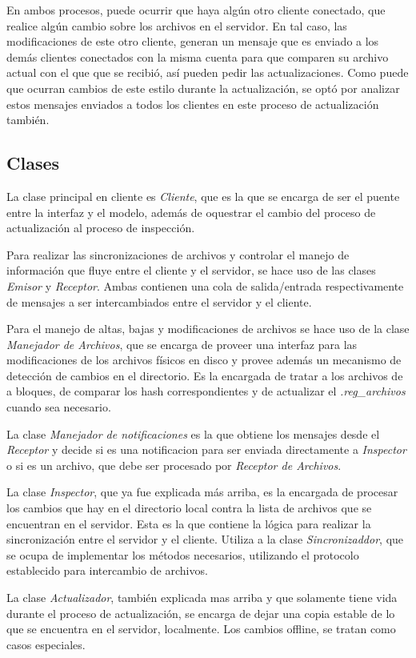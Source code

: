 \documentclass{article}
\begin{document}
	\par
	En ambos procesos, puede ocurrir que haya algún otro cliente conectado, que realice algún cambio sobre los archivos en el servidor. En tal caso, las modificaciones de este otro cliente, generan un mensaje que es enviado a los demás clientes conectados con la misma cuenta para que comparen su archivo actual con el que que se recibió, así pueden pedir las actualizaciones. Como puede que ocurran cambios de este estilo durante la actualización, se optó por analizar estos mensajes enviados a todos los clientes en este proceso de actualización también.
\bigskip



\subsection{Clases}

	La clase principal en cliente es \textit{Cliente}, que es la que se encarga de ser el puente entre la interfaz y el modelo, además de oquestrar el cambio del proceso de actualización al proceso de inspección. 
	\par
	Para realizar las sincronizaciones de archivos y controlar el manejo de información que fluye entre el cliente y el servidor, se hace uso de las clases \textit{Emisor} y \textit{Receptor}. Ambas contienen una cola de salida/entrada respectivamente de mensajes a ser intercambiados entre el servidor y el cliente. 
	\par
	Para el manejo de altas, bajas y modificaciones de archivos se hace uso de la clase \textit{Manejador de Archivos}, que se encarga de proveer una interfaz para las modificaciones de los archivos físicos en disco y provee además un mecanismo de detección de cambios en el directorio. Es la encargada de tratar a los archivos de a bloques, de comparar los hash correspondientes y de actualizar el \textit{.reg_archivos} cuando sea necesario. 
	\par
	La clase \textit{Manejador de notificaciones} es la que obtiene los mensajes desde el \textit{Receptor} y decide si es una notificacion para ser enviada directamente a \textit{Inspector} o si es un archivo, que debe ser procesado por \textit{Receptor de Archivos}. 
	\par
	La clase \textit{Inspector}, que ya fue explicada más arriba, es la encargada de procesar los cambios que hay en el directorio local contra la lista de archivos que se encuentran en el servidor. Esta es la que contiene la lógica para realizar la sincronización entre el servidor y el cliente. Utiliza a la clase \textit{Sincronizaddor}, que se ocupa de implementar los métodos necesarios, utilizando el protocolo establecido para intercambio de archivos.
	\par
	La clase \textit{Actualizador}, también explicada mas arriba y que solamente tiene vida durante el proceso de actualización, se encarga de dejar una copia estable de lo que se encuentra en el servidor, localmente. Los cambios offline, se tratan como casos especiales. 
\bigskip
\end{document}
